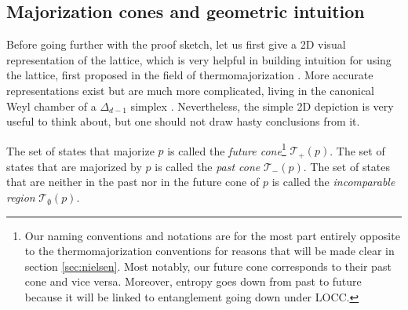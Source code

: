\subsection{Majorization cones and geometric intuition} \label{sec:majorization_cones}

Before going further with the proof sketch, let us first give a 2D visual representation of the lattice, which is very helpful in building intuition for using the lattice, first proposed in the field of thermomajorization \cite{korzekwa_structure_2017}. More accurate representations exist but are much more complicated, living in the canonical Weyl chamber of a $\Delta_{d-1}$ simplex \cite{junior_geometric_2022}. Nevertheless, the simple 2D depiction is very useful to think about, but one should not draw hasty conclusions from it.

\begin{definition} \label{def:majorization_cones}
    The set of states that majorize $p$ is called the \textit{future cone}\footnote{Our naming conventions and notations are for the most part entirely opposite to the thermomajorization conventions for reasons that will be made clear in section \ref{sec:nielsen}. Most notably, our future cone corresponds to their past cone and vice versa. Moreover, entropy goes down from past to future because it will be linked to entanglement going down under LOCC.}  $\mathcal{T}_+ (p)$. The set of states that are majorized by $p$ is called the \textit{past cone} $\mathcal{T}_- (p)$. The set of states that are neither in the past nor in the future cone of $p$ is called the \textit{incomparable region} $\mathcal{T}_\emptyset (p)$.
\end{definition}

